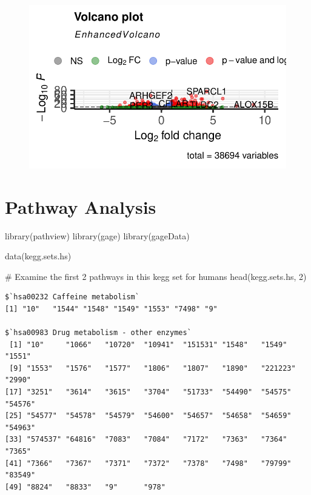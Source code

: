 \documentclass[
  letterpaper,
  DIV=11,
  numbers=noendperiod]{scrartcl}
\newenvironment{Shaded}{\begin{snugshade}}{\end{snugshade}}
\newcommand{\CommentTok}[1]{\textcolor[rgb]{0.37,0.37,0.37}{#1}}
\newcommand{\DecValTok}[1]{\textcolor[rgb]{0.68,0.00,0.00}{#1}}
\newcommand{\FunctionTok}[1]{\textcolor[rgb]{0.28,0.35,0.67}{#1}}
\newcommand{\NormalTok}[1]{\textcolor[rgb]{0.00,0.23,0.31}{#1}}
\begin{document}
\begin{figure}[H]

{\centering \includegraphics{Class12_files/figure-pdf/unnamed-chunk-28-1.pdf}

}

\end{figure}

\hypertarget{pathway-analysis}{%
\section{Pathway Analysis}\label{pathway-analysis}}

\begin{Shaded}
\begin{Highlighting}[]
\FunctionTok{library}\NormalTok{(pathview)}
\FunctionTok{library}\NormalTok{(gage)}
\FunctionTok{library}\NormalTok{(gageData)}

\FunctionTok{data}\NormalTok{(kegg.sets.hs)}

\CommentTok{\# Examine the first 2 pathways in this kegg set for humans}
\FunctionTok{head}\NormalTok{(kegg.sets.hs, }\DecValTok{2}\NormalTok{)}
\end{Highlighting}
\end{Shaded}

\begin{verbatim}
$`hsa00232 Caffeine metabolism`
[1] "10"   "1544" "1548" "1549" "1553" "7498" "9"   

$`hsa00983 Drug metabolism - other enzymes`
 [1] "10"     "1066"   "10720"  "10941"  "151531" "1548"   "1549"   "1551"  
 [9] "1553"   "1576"   "1577"   "1806"   "1807"   "1890"   "221223" "2990"  
[17] "3251"   "3614"   "3615"   "3704"   "51733"  "54490"  "54575"  "54576" 
[25] "54577"  "54578"  "54579"  "54600"  "54657"  "54658"  "54659"  "54963" 
[33] "574537" "64816"  "7083"   "7084"   "7172"   "7363"   "7364"   "7365"  
[41] "7366"   "7367"   "7371"   "7372"   "7378"   "7498"   "79799"  "83549" 
[49] "8824"   "8833"   "9"      "978"   
\end{verbatim}
\end{document}
